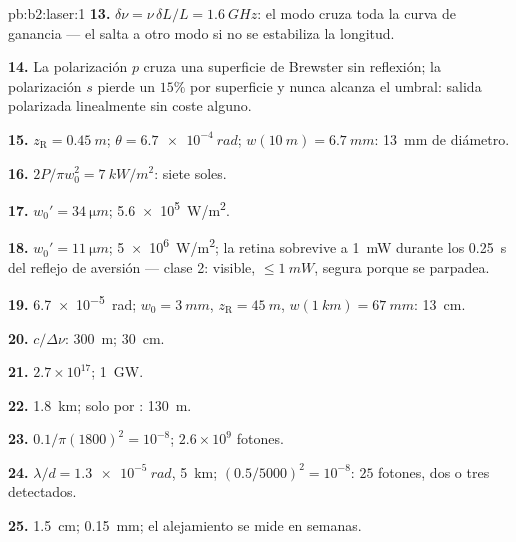 \begin{solution}{pb:b2:laser:1}
\textbf{13.} $\delta\nu = \nu\,\delta L/L = \qty{1.6}{GHz}$: el modo cruza toda la
curva de ganancia --- el  salta a otro modo si no se estabiliza la longitud.

\textbf{14.} La polarización $p$ cruza una superficie de Brewster sin
reflexión; la polarización $s$ pierde un $15\%$ por superficie y
nunca alcanza el umbral: salida polarizada linealmente sin coste alguno.

\textbf{15.} $z_{\text{R}} = \qty{0.45}{m}$; $\theta = \qty{6.7e-4}{rad}$; $w(\qty{10}{m})
= \qty{6.7}{mm}$: \qty{13}{mm} de diámetro.

\textbf{16.} $2P/\pi w_0^2 = \qty{7}{kW/m^2}$: siete soles.

\textbf{17.} $w_0' = \qty{34}{\micro m}$; \qty{5.6e5}{W/m^2}.

\textbf{18.} $w_0' = \qty{11}{\micro m}$; \qty{5e6}{W/m^2}; la retina sobrevive a
\qty{1}{mW} durante los \qty{0.25}{s} del reflejo de aversión --- clase 2: visible,
$\le \qty{1}{mW}$, segura porque se parpadea.

\textbf{19.} \qty{6.7e-5}{rad}; $w_0 = \qty{3}{mm}$, $z_{\text{R}} = \qty{45}{m}$,
$w(\qty{1}{km}) = \qty{67}{mm}$: \qty{13}{cm}.

\textbf{20.} $c/\Delta\nu$: \qty{300}{m}; \qty{30}{cm}.

\textbf{21.} $2.7 \times 10^{17}$; \qty{1}{GW}.

\textbf{22.} \qty{1.8}{km}; solo por : \qty{130}{m}.

\textbf{23.} $0.1/\pi(1800)^2 = 10^{-8}$; $2.6 \times 10^9$ fotones.

\textbf{24.} $\lambda/d = \qty{1.3e-5}{rad}$, \qty{5}{km}; $(0.5/5000)^2 = 10^{-8}$:
$25$ fotones, dos o tres detectados.

\textbf{25.} \qty{1.5}{cm}; \qty{0.15}{mm}; el alejamiento se mide en
semanas.
\end{solution}
